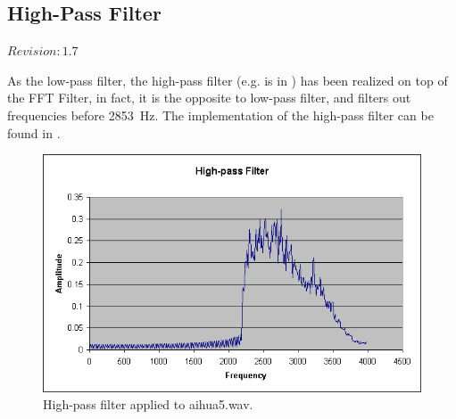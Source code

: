 \subsection{High-Pass Filter}

$Revision: 1.7 $

As the low-pass filter, the high-pass filter (e.g. is in )
has been realized on top of the FFT Filter,
in fact, it is the opposite to low-pass filter, and filters out
frequencies before 2853~Hz.
The implementation of the high-pass filter can be found in
.

\begin{figure}
	\centering
	\includegraphics[width=400pt]{../graphics/graphs/high-pass-filter.png}
	\caption{High-pass filter applied to aihua5.wav.}
	\label{fig:high-pass}
\end{figure}


